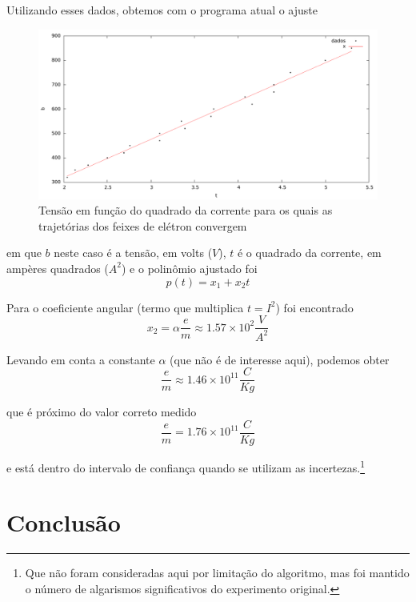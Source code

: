 \documentclass[a4paper,11pt]{article}
\begin{document}
        Utilizando esses dados, obtemos com o programa atual o ajuste
        \begin{figure}[h]
            \caption{Tensão em função do quadrado da corrente para os quais as trajetórias dos feixes de elétron convergem}
            \includegraphics[width=\textwidth]{Dados/dados2.pdf}
        \end{figure}

        em que $b$ neste caso é a tensão, em volts ($V$), $t$ é o quadrado da corrente, em ampères quadrados ($A^2$) e o polinômio ajustado foi
        $$ p(t) = x_1 + x_2t $$

        \newpage
        Para o coeficiente angular (termo que multiplica $t = I^2$) foi encontrado
        $$ x_2 = \alpha \frac{e}{m} \approx 1.57\times 10^2 \frac{V}{A^2}$$

        Levando em conta a constante $\alpha$ (que não é de interesse aqui), podemos obter
        $$ \frac{e}{m} \approx 1.46\times 10^{11} \frac{C}{Kg} $$

        que é próximo do valor correto medido
        $$ \frac{e}{m} = 1.76\times 10^{11} \frac{C}{Kg} $$

        e está dentro do intervalo de confiança quando se utilizam as incertezas.\footnote{Que não foram consideradas aqui por limitação do algoritmo, mas foi mantido o número de algarismos significativos do experimento original.}
    \section*{Conclusão}
\end{document}
